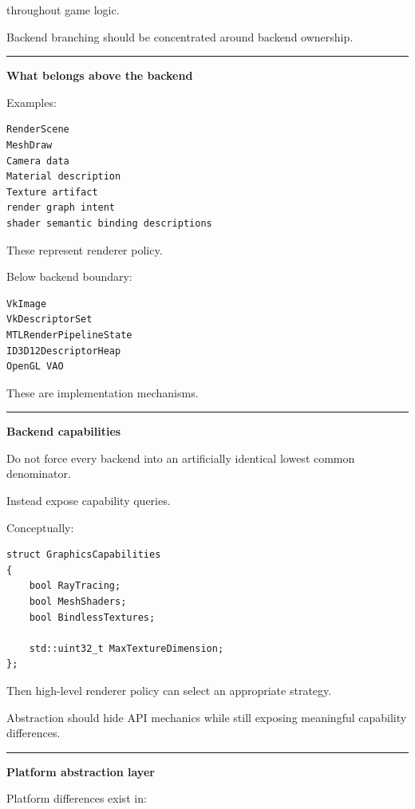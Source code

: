 throughout game logic.

Backend branching should be concentrated around backend ownership.

\begin{center}\rule{0.5\linewidth}{0.5pt}\end{center}

\textbf{What belongs above the backend}

Examples:

\begin{verbatim}
RenderScene
MeshDraw
Camera data
Material description
Texture artifact
render graph intent
shader semantic binding descriptions
\end{verbatim}

These represent renderer policy.

Below backend boundary:

\begin{verbatim}
VkImage
VkDescriptorSet
MTLRenderPipelineState
ID3D12DescriptorHeap
OpenGL VAO
\end{verbatim}

These are implementation mechanisms.

\begin{center}\rule{0.5\linewidth}{0.5pt}\end{center}

\textbf{Backend capabilities}

Do not force every backend into an artificially identical lowest common denominator.

Instead expose capability queries.

Conceptually:

\begin{verbatim}
struct GraphicsCapabilities
{
    bool RayTracing;
    bool MeshShaders;
    bool BindlessTextures;

    std::uint32_t MaxTextureDimension;
};
\end{verbatim}

Then high-level renderer policy can select an appropriate strategy.

Abstraction should hide API mechanics while still exposing meaningful capability differences.

\begin{center}\rule{0.5\linewidth}{0.5pt}\end{center}

\textbf{Platform abstraction layer}

Platform differences exist in:


